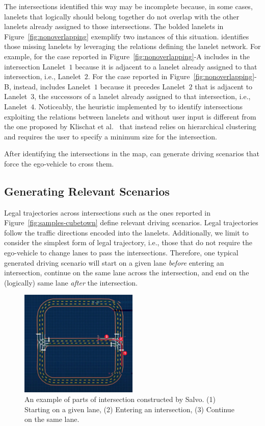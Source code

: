 \documentclass[conference]{IEEEtran}
\begin{document}
The intersections identified this way may be incomplete because, in some cases, lanelets that logically should belong together do not overlap with the other lanelets already assigned to those intersections. The bolded lanelets in Figure~\ref{fig:nonoverlapping} exemplify two instances of this situation. \tool identifies those missing lanelets by leveraging the relations defining the lanelet network. For example, for the case reported in \mbox{Figure~\ref{fig:nonoverlapping}-A} \tool includes in the intersection Lanelet~$1$ because it is adjacent to a lanelet already assigned to that intersection, i.e., Lanelet~$2$. For the case reported in \mbox{Figure~\ref{fig:nonoverlapping}-B}, instead, \tool includes Lanelet~$1$ because it precedes Lanelet~$2$ that is adjacent to Lanelet~$3$, the successors of a lanelet already assigned to that intersection, i.e., Lanelet~$4$. 
%
Noticeably, the heuristic implemented by \tool to identify intersections exploiting the relations between lanelets and without user input is different from the one proposed by Klischat et al.~\cite{DBLP:conf/itsc/KlischatLHA20} that instead relies on hierarchical clustering and requires the user to specify a minimum size for the intersection.

After identifying the intersections in the map, \tool can generate driving scenarios that force the ego-vehicle to cross them.

\subsection{Generating Relevant Scenarios}
Legal trajectories across intersections such as the ones reported in Figure~\ref{fig:samples-cubetown} define relevant driving scenarios. Legal trajectories follow the traffic directions encoded into the lanelets. Additionally, we limit \tool to consider the simplest form of legal trajectory, i.e., those that do not require the ego-vehicle to change lanes to pass the intersections. Therefore, one typical generated driving scenario will start on a given lane \emph{before} entering an intersection, continue on the same lane across the intersection, and end on the (logically) same lane \emph{after} the intersection.
%
\begin{figure}[H]
  \centering
    \includegraphics[width=0.5\textwidth]{images/lanelet01}
  \caption{An example of parts of intersection constructed by Salvo. (1) Starting on a given lane, (2) Entering an intersection, (3) Continue on the same lane.}
  \label{fig:intersection_sf}
\end{figure}
\end{document}
